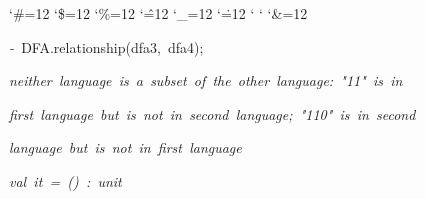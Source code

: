 \begin{list}{}
{\setlength{\leftmargin}{\leftmargini}
\setlength{\rightmargin}{0cm}
\setlength{\itemindent}{0cm}
\setlength{\listparindent}{0cm}
\setlength{\itemsep}{0cm}
\setlength{\parsep}{0cm}
\setlength{\labelsep}{0cm}
\setlength{\labelwidth}{0cm}
\catcode`\#=12
\catcode`\$=12
\catcode`\%=12
\catcode`\^=12
\catcode`\_=12
\catcode`\.=12
\catcode`
\catcode`
\catcode`\&=12
\ttfamily}
\small
\item[]\textsl{-\ }DFA.relationship(dfa3,\ dfa4);
\item[]\textsl{neither\ language\ is\ a\ subset\ of\ the\ other\ language:\ "11"\ is\ in}
\item[]\textsl{first\ language\ but\ is\ not\ in\ second\ language;\ "110"\ is\ in\ second}
\item[]\textsl{language\ but\ is\ not\ in\ first\ language}
\item[]\textsl{val\ it\ =\ ()\ :\ unit}
\end{list}
